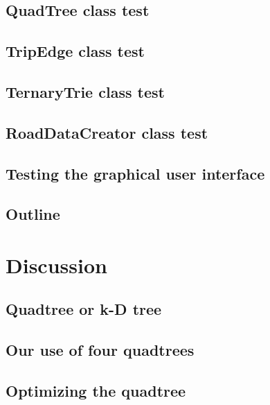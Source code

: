 \documentclass[a4paper,11pt]{article}
\begin{document}
\subsection{QuadTree class test}


\subsection{TripEdge class test}


\subsection{TernaryTrie class test}

\subsection{RoadDataCreator class test}


\subsection{Testing the graphical user interface}


\subsection{Outline}


\pagebreak
\section{Discussion}
\label{sec:Discussion}

\subsection{Quadtree or k-D tree}


\subsection{Our use of four quadtrees}


\subsection{Optimizing the quadtree}

\end{document}
